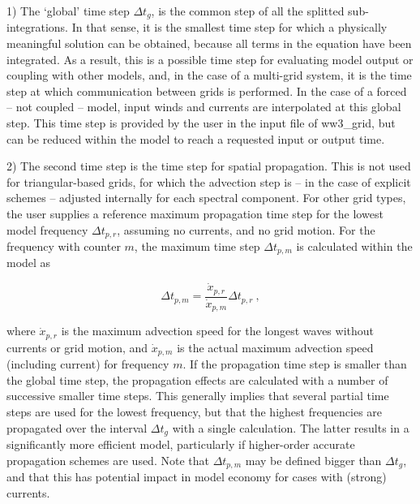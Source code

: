 \begin{list}{xx}{\itemsep 0mm \parsep 0mm \rightmargin 5mm}

\item[1)] The `global' time step $\Delta t_g$, is the common step of all the splitted sub-integrations. In that sense, 
it is the smallest time step for which a physically meaningful solution can be obtained, because all terms in the equation have been 
integrated. As a result, this is a possible time step for evaluating model output or coupling with other models, 
and, in the case of a multi-grid system,  it is the time step at which communication 
between grids is performed. In the case of a forced -- not coupled -- model, input winds and currents are
interpolated at this global step. This time step is provided by the user in the input file of {\code ww3\_grid}, but can be reduced
within the model to reach a requested input or output time.

\item[2)] The second time step is the time step for spatial propagation. This is not used for triangular-based 
grids, for which the advection step is -- in the case of explicit schemes -- adjusted internally for each spectral component. For other grid types, the
user supplies a reference maximum propagation time step for the lowest model
frequency $\Delta t_{p,r}$, assuming no currents, and no grid motion. For the
frequency with counter $m$, the maximum time step $\Delta t_{p,m}$ is
calculated within the model as


\begin{equation}
\Delta t_{p,m} = \frac{{\dot{x}}_{p,r}}{{\dot{x}}_{p,m}} \Delta t_{p,r}
\: , \label{eq:dtpl} \end{equation}

\noindent
where $\dot{x}_{p,r}$ is the maximum advection speed for the longest waves
without currents or grid motion, and $\dot{x}_{p,m}$ is the actual maximum
advection speed (including current) for frequency $m$. If the propagation time
step is smaller than the global time step, the propagation effects are
calculated with a number of successive smaller time steps. This generally
implies that several partial time steps are used for the lowest frequency, but
that the highest frequencies are propagated over the interval $\Delta t_g$
with a single calculation. The latter results in a significantly more
efficient model, particularly if higher-order accurate propagation schemes are
used. Note that $\Delta t_{p,m}$ may be defined bigger than $\Delta t_g$, and
that this has potential impact in model economy for cases with (strong)
currents.


\end{list}
